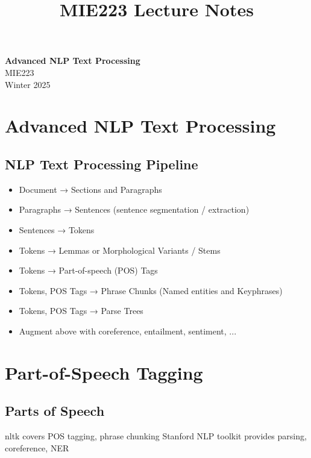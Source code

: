\documentclass[11pt]{article}
\theoremstyle{definition}
\begin{document}
\setcounter{section}{0}
\title{MIE223 Lecture Notes}

\thispagestyle{empty}

\begin{center}
{\LARGE \bf Advanced NLP Text Processing}\\
{\large MIE223}\\
Winter 2025
\end{center}
\section{Advanced NLP Text Processing}
\subsection{NLP Text Processing Pipeline}
\begin{itemize}
  \item Document → Sections and Paragraphs
  \item Paragraphs → Sentences (sentence segmentation / extraction)
  \item Sentences → Tokens
  \item Tokens → Lemmas or Morphological Variants / Stems
  \item Tokens → Part-of-speech (POS) Tags
  \item Tokens, POS Tags → Phrase Chunks (Named entities and Keyphrases)
  \item Tokens, POS Tags → Parse Trees
  \item Augment above with coreference, entailment, sentiment, ...
\end{itemize}

\section{Part-of-Speech Tagging}

\subsection{Parts of Speech}

nltk covers POS tagging,
phrase chunking
Stanford NLP toolkit
provides parsing,
coreference, NER
\end{document}
